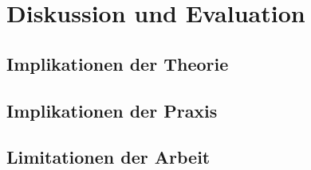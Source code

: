 \chapter{Diskussion und Evaluation} %

\section{Implikationen der Theorie}

\section{Implikationen der Praxis}

\section{Limitationen der Arbeit}
